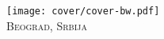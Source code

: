 \newpage
\thispagestyle{empty}
\begin{center}
\texttt{[image: cover/cover-bw.pdf]}\\[1pc]
{\scshape Beograd, Srbija \\ \year}	
\end{center}

